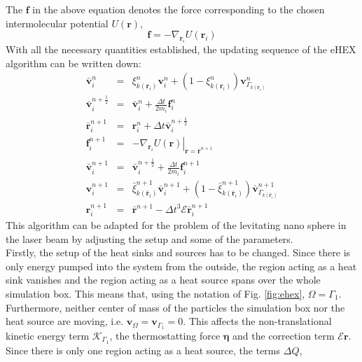 \documentclass[12pt]{article}
\begin{document}
The $\mathbf{f}$ in the above equation denotes the force corresponding to the chosen intermolecular potential $U(\mathbf{r})$, 
\begin{equation}
    \mathbf{f} = -\nabla_{\mathbf{r}_i} U(\mathbf{r}_i)
\end{equation}
With all the necessary quantities established, the updating sequence of the eHEX algorithm can be written down:
\begin{subequations}
\begin{eqnarray}
    \bar{\mathbf{v}}^n_i &=& \xi^n_{k(\mathbf{r}_i)} \mathbf{v}^n_i + \left(1-\xi^n_{k(\mathbf{r}_i)}\right) \mathbf{v}^n_{\Gamma_{k(\mathbf{r}_i)}} \\
    \bar{\mathbf{v}}^{n+\frac12}_i &=& \bar{\mathbf{v}}^n_i + \frac{\Delta t}{2m_i} \mathbf{f}^n_i\\
    \bar{\mathbf{r}}^{n+1}_i &=& \mathbf{r}^n_i + \Delta t \bar{\mathbf{v}}^{n+\frac12}_i\\
    \mathbf{f}^{n+1}_i &=& \left.-\nabla_{\mathbf{r}_i} U(\mathbf{r})\right|_{\mathbf{r} = \bar{\mathbf{r}}^{n+1}}\\
    \bar{\mathbf{v}}^{n+1}_i &=& \bar{\mathbf{v}}^{n+\frac12}_i + \frac{\Delta t}{2m_i} \mathbf{f}^{n+1}_i\\
    \mathbf{v}^{n+1}_i &=& \bar{\xi}^{n+1}_{k(\bar{\mathbf{r}}_i)} \bar{\mathbf{v}}^{n+1}_i + \left(1-\bar{\xi}^{n+1}_{k(\bar{\mathbf{r}}_i)}\right)
    \bar{\mathbf{v}}^{n+1}_{\Gamma_{k(\bar{\mathbf{r}}_i)}} \\
    \mathbf{r}^{n+1}_i &=& \bar{\mathbf{r}}^{n+1} - \Delta t^3 \mathcal{E}\bar{\mathbf{r}}^{n+1}_i
\end{eqnarray}
\end{subequations}
This algorithm can be adapted for the problem of the levitating nano sphere in the laser beam by adjusting the setup and some of the parameters.\\
Firstly, the setup of the heat sinks and sources has to be changed. Since there is only energy pumped into the system from the outside, the region
acting as a heat sink vanishes and the region acting as a heat source spans over the whole simulation box. This means that, using the 
notation of Fig. \ref{fig:ehex}, $\Omega = \Gamma_1$. Furthermore, neither center of mass of the particles the simulation box nor 
the heat source are moving, i.e. 
$\mathbf{v}_\Omega = \mathbf{v}_{\Gamma_1} = 0$. This affects the non-translational kinetic energy term $\mathcal{K}_{\Gamma_1}$, the thermostatting
force $\boldsymbol{\eta}$ and the correction term $\mathcal{E}\mathbf{r}$. Since there is only one region acting as a heat source, the terms $\Delta Q$,
\end{document}

